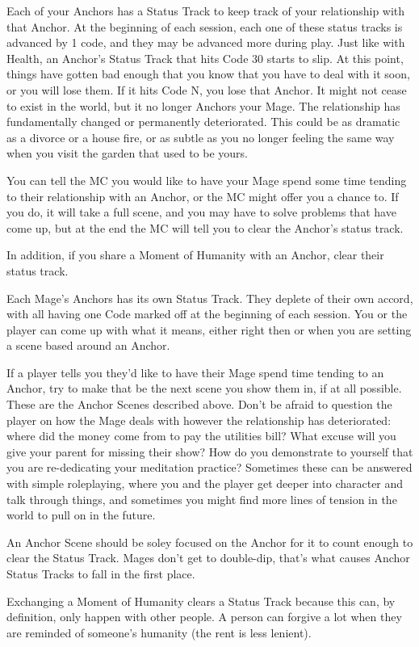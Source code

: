 \documentclass[
  oneside,
  statementpaper,
  9pt]{memoir}
\begin{document}
\begin{Player}

Each of your Anchors has a Status Track to keep track of your relationship with that Anchor. At the beginning of each session, each one of these status tracks is advanced by 1 code, and they may be advanced more during play. Just like with Health, an Anchor's Status Track that hits Code 30 starts to slip. At this point, things have gotten bad enough that you know that you have to deal with it soon, or you will lose them. If it hits Code N, you lose that Anchor. It might not cease to exist in the world, but it no longer Anchors your Mage. The relationship has fundamentally changed or permanently deteriorated. This could be as dramatic as a divorce or a house fire, or as subtle as you no longer feeling the same way when you visit the garden that used to be yours.

You can tell the MC you would like to have your Mage spend some time tending to their relationship with an Anchor, or the MC might offer you a chance to. If you do, it will take a full scene, and you may have to solve problems that have come up, but at the end the MC will tell you to clear the Anchor's status track.

In addition, if you share a Moment of Humanity with an Anchor, clear their status track.

\end{Player}

\begin{MC}

Each Mage's Anchors has its own Status Track. They deplete of their own accord, with all having one Code marked off at the beginning of each session. You or the player can come up with what it means, either right then or when you are setting a scene based around an Anchor.

If a player tells you they'd like to have their Mage spend time tending to an Anchor, try to make that be the next scene you show them in, if at all possible. These are the Anchor Scenes described above. Don't be afraid to question the player on how the Mage deals with however the relationship has deteriorated: where did the money come from to pay the utilities bill? What excuse will you give your parent for missing their show? How do you demonstrate to yourself that you are re-dedicating your meditation practice? Sometimes these can be answered with simple roleplaying, where you and the player get deeper into character and talk through things, and sometimes you might find more lines of tension in the world to pull on in the future.

An Anchor Scene should be soley focused on the Anchor for it to count enough to clear the Status Track. Mages don't get to double-dip, that's what causes Anchor Status Tracks to fall in the first place.

Exchanging a Moment of Humanity clears a Status Track because this can, by definition, only happen with other people. A person can forgive a lot when they are reminded of someone's humanity (the rent is less lenient).

\end{MC}
\end{document}
